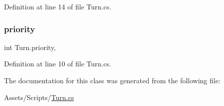 Definition at line 14 of file Turn.\+cs.

\mbox{\label{class_turn_aad40e669aa7299a23aa01c1756edd975}} 
\subsubsection{\texorpdfstring{priority}{priority}}
{\footnotesize\ttfamily int Turn.\+priority\hspace{0.3cm}{\ttfamily [get]}, {\ttfamily [set]}}



Definition at line 10 of file Turn.\+cs.



The documentation for this class was generated from the following file\+:\begin{DoxyCompactItemize}
\item 
Assets/\+Scripts/\mbox{\hyperlink{_turn_8cs}{Turn.\+cs}}\end{DoxyCompactItemize}

